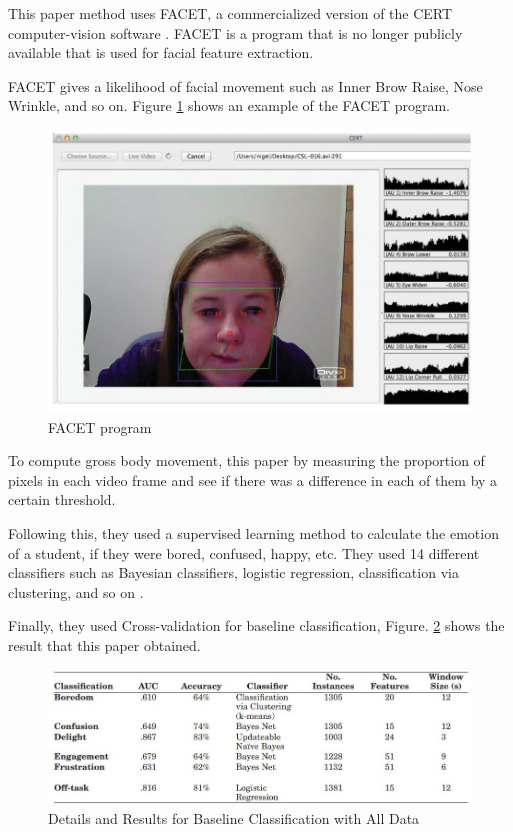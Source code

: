 \documentclass[conference]{IEEEtran}
\begin{document}
This paper method uses FACET, a commercialized version of the CERT computer-vision software \cite{b14}. FACET is a program that is no longer publicly available that is used for facial feature extraction.
 
FACET gives a likelihood of facial movement such as Inner Brow Raise, Nose Wrinkle, and so on. Figure \ref{FACET} shows an example of the FACET program.

\begin{figure}[htbp]
\includegraphics[width=\columnwidth]{FACET.JPG}
\caption{FACET program}
\label{FACET}
\end{figure}

To compute gross body movement, this paper by measuring the proportion of pixels in each video frame and see if there was a difference in each of them by a certain threshold.
 
Following this, they used a supervised learning method to calculate the emotion of a student, if they were bored, confused, happy, etc. They used 14 different classifiers such as Bayesian classifiers,
logistic regression, classification via clustering, and so on \cite{b14}.
 
Finally, they used Cross-validation for baseline classification, Figure. \ref{Table2} shows the result that this paper obtained.

\begin{figure}[htbp]
    \includegraphics[width=\columnwidth]{Table2.JPG}
    \caption{Details and Results for Baseline Classification with All Data}
    \label{Table2}
    \end{figure}
\end{document}
